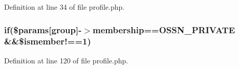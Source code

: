 Definition at line 34 of file profile.\+php.

\subsubsection[{\texorpdfstring{if}{if}}]{\setlength{\rightskip}{0pt plus 5cm}if(\$params\mbox{[}\textquotesingle{}group\textquotesingle{}\mbox{]}-\/$>$membership=={\bf O\+S\+S\+N\+\_\+\+P\+R\+I\+V\+A\+TE} \&\&\$ismember!==1)}\hypertarget{_ossn_groups_2plugins_2default_2groups_2pages_2profile_8php_a8c40c1917df317d92ce8569173ee54cb}{}\label{_ossn_groups_2plugins_2default_2groups_2pages_2profile_8php_a8c40c1917df317d92ce8569173ee54cb}


Definition at line 120 of file profile.\+php.

